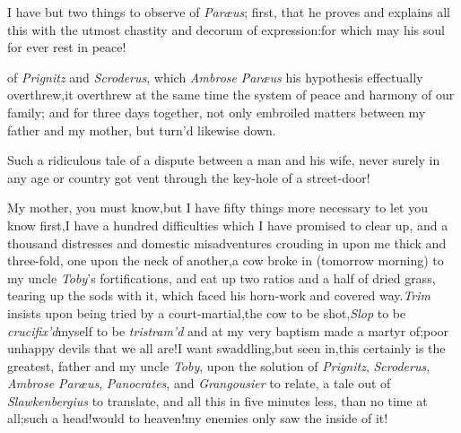 \documentclass{article}
\begin{document}
I have but two things to observe of \textit{Paræus}; first, that
he proves and explains all this with the utmost chastity and
decorum of expression:\tsk for which may his soul for ever rest
in peace!

\noindent
{} 
of \textit{Prignitz} and \textit{Scroderus}, which
\textit{Ambrose} \textit{Paræus} his
hypothesis effectually overthrew,\tsk it overthrew at the same
time the system of peace and harmony of our family; and for
three days together, not only embroiled matters between my
father and my mother, but turn’d likewise \break {} down.

Such a ridiculous tale of a dispute between a man and his wife,
never surely in any age or country got vent through the key-hole of
a street-door!

My mother, you must know,\tsh but I have fifty
things more necessary to let you know first,\tsk I have a hundred
difficulties which I have promised to clear up, and a thousand
distresses and domestic misadventures crouding in upon me thick
and three-fold, one upon the neck of another,\tsh a cow broke in
(tomorrow morning) to my uncle \textit{Toby}’s fortifications,
and eat up two ratios and a half of dried grass, tearing up the
sods with\break
it, which faced his horn-work and covered
way.\tsk \textit{Trim} insists upon being tried by a
court-martial,\tsk the cow to be shot,\break\tsk \textit{Slop} to be
\textit{crucifix’d}\tsk myself to be \textit{tris\-tram’d}
and at my very baptism made a martyr of;\tsh poor unhappy
devils that we all are!\tsk I want
swaddling,\tsh but\break
{}
seen in,\tsk this certainly is the greatest,
father and my
uncle \textit{Toby}, upon the solution of \textit{Prignitz}, \textit{Scroderus},
\textit{Ambrose Pa\-ræus}, \textit{Panocrates}, and \textit{Grangousier} to
relate,\tsk
a tale out of \textit{Slawkenbergius} to translate, and
all this in five minutes less, than no time at
all;\tsh such a head!\tsk would to heaven!\@ my enemies
only saw the inside of it!
\end{document}
